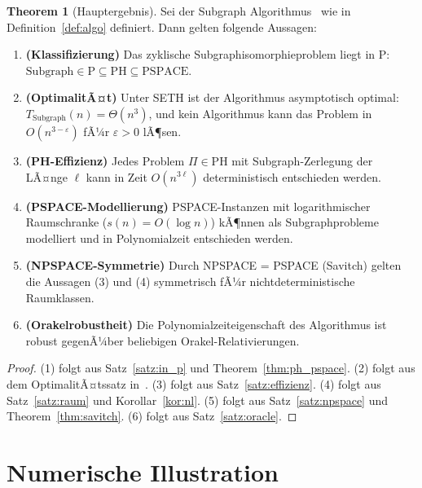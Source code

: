﻿\documentclass[a4paper,12pt]{article}
\theoremstyle{definition}
\newtheorem{theorem}{Theorem}
\begin{document}
\begin{theorem}[Hauptergebnis]
\label{thm:main}
  Sei der Subgraph Algorithmus~\cite{epp2026subgraph} wie in Definition~\ref{def:algo} definiert.
  Dann gelten folgende Aussagen:
  \begin{enumerate}
    \item \textbf{(Klassifizierung)} Das zyklische Subgraphisomorphieproblem liegt in P:
          $\mathrm{Subgraph} \in \mathrm{P} \subseteq \mathrm{PH} \subseteq \mathrm{PSPACE}$.
    \item \textbf{(OptimalitÃ¤t)} Unter SETH ist der Algorithmus asymptotisch optimal:
          $T_{\mathrm{Subgraph}}(n) = \Theta(n^3)$, und kein Algorithmus kann
          das Problem in $O(n^{3-\varepsilon})$ fÃ¼r $\varepsilon > 0$ lÃ¶sen.
    \item \textbf{(PH-Effizienz)} Jedes Problem $\Pi \in \mathrm{PH}$ mit
          Subgraph-Zerlegung der LÃ¤nge $\ell$ kann in Zeit $O(n^{3\ell})$
          deterministisch entschieden werden.
    \item \textbf{(PSPACE-Modellierung)} PSPACE-Instanzen mit logarithmischer
          Raumschranke ($s(n) = O(\log n)$) kÃ¶nnen als Subgraphprobleme modelliert
          und in Polynomialzeit entschieden werden.
    \item \textbf{(NPSPACE-Symmetrie)} Durch NPSPACE = PSPACE (Savitch) gelten
          die Aussagen (3) und (4) symmetrisch fÃ¼r nichtdeterministische Raumklassen.
    \item \textbf{(Orakelrobustheit)} Die Polynomialzeiteigenschaft des Algorithmus
          ist robust gegenÃ¼ber beliebigen Orakel-Relativierungen.
  \end{enumerate}
\end{theorem}

\begin{proof}
  (1) folgt aus Satz~\ref{satz:in_p} und Theorem~\ref{thm:ph_pspace}.
  (2) folgt aus dem OptimalitÃ¤tssatz in~\cite{epp2026subgraph}.
  (3) folgt aus Satz~\ref{satz:effizienz}.
  (4) folgt aus Satz~\ref{satz:raum} und Korollar~\ref{kor:nl}.
  (5) folgt aus Satz~\ref{satz:npspace} und Theorem~\ref{thm:savitch}.
  (6) folgt aus Satz~\ref{satz:oracle}.
\end{proof}

\section{Numerische Illustration}
\end{document}

